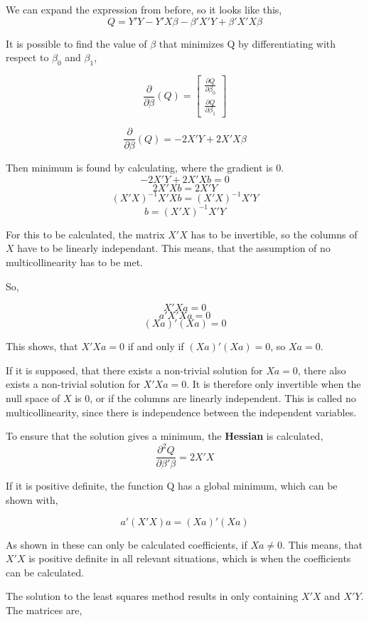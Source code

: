	We can expand the expression from before, so it looks like this,
	$$Q=Y' Y -Y' X \beta -\beta' X' Y + \beta' X' X \beta$$
	
	
	It is possible to find the value of $\beta$ that minimizes Q by differentiating with respect to $\beta_0$ and $\beta_1$,
	
	$$
	\frac{\partial}{\partial \beta}(Q)=
	\left[
	\begin{array}{c}
		\frac{\partial Q}{\partial \beta_0}\\ 
		\frac{\partial Q}{\partial \beta_1}
	\end{array}
	\right]
	$$
	
	$$
	\frac{\partial}{\partial \beta}(Q)=-2 X' Y + 2X' X \beta$$
	
	Then minimum is found by calculating, where the gradient is 0.
	$$-2 X' Y+ 2X' X b=0$$
	$$ 2X' X b = 2X' Y$$
	$$(X' X)^{-1} X' X b = (X' X)^{-1} X' Y$$
	$$ b =(X' X)^{-1} X' Y$$
	
	
	For this to be calculated, the matrix $X' X$ has to be invertible, so the columns of $X$ have to be linearly independant.
	This means, that the assumption of no multicollinearity has to be met.
	
	So, 
	
	$$X' Xa  =0$$
	$$ a' X' X a =0$$
	$$(Xa)'(Xa)=0$$
	
	This shows, that $X'Xa=0$ if and only if $(Xa)'(Xa)=0$, so $Xa=0$. 
	
	If it is supposed, that there exists a non-trivial solution for $Xa=0$, there also exists a non-trivial solution for $X'Xa=0$. It is therefore only invertible when the null space of $X$ is 0, or if the columns are linearly independent. This is called no multicollinearity, since there is independence between the independent variables. 
	
	To ensure that the solution gives a minimum, the \textbf{Hessian} is calculated,
	$$\frac{\partial^2 Q}{\partial \beta' \beta}=2X'X$$
	
	If it is positive definite, the function Q has a global minimum, which can be shown with,
	
	$$a' (X' X)a = (Xa)' (Xa)$$
	
	As shown in %
	these can only be calculated coefficients, if $Xa \not= 0$. This means, that $X'X$ is positive definite in all relevant situations, which is when the coefficients can be calculated. 
	
	The solution to the least squares method results in only containing $X'X$ and $X'Y$.
	The matrices are,
	
